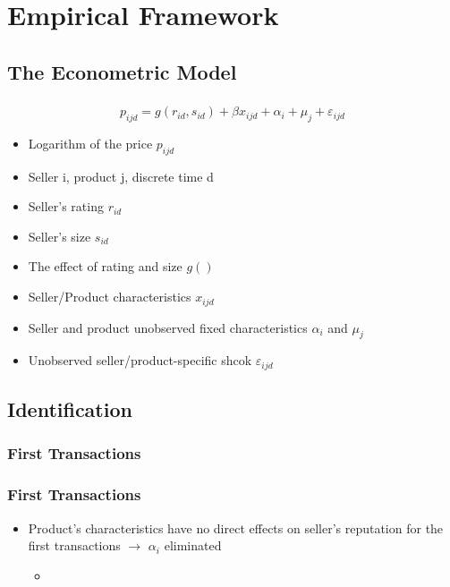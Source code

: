 \documentclass{beamer}
\begin{document}
\begin{frame}
\frametitle{}
\end{frame}

\section{}

\section{Empirical Framework}
\subsection{The Econometric Model}
\begin{frame}
\frametitle{}
$$
p_{ijd}=g(r_{id},s_{id})+\beta x_{ijd}+\alpha_i+\mu_j+\varepsilon_{ijd}
$$
\begin{itemize}
\item Logarithm of the price $p_{ijd}$
\item Seller i, product j, discrete time d
\item Seller's rating $r_{id}$
\item Seller's size $s_{id}$
\item The effect of rating and size $g()$
\item Seller/Product characteristics $x_{ijd}$
\item Seller and product unobserved fixed characteristics $\alpha_i$ and $\mu_j$
\item Unobserved seller/product-specific shcok $\varepsilon_{ijd}$
\end{itemize}
\end{frame}

\begin{frame}
\end{frame}

\subsection{Identification}
\subsubsection{First Transactions}
\begin{frame}
\frametitle{First Transactions}
\begin{itemize}
\item Product's characteristics have no direct effects on seller's reputation for the first transactions $\to$ $\alpha_i$ eliminated
\begin{itemize}
\item 
\end{itemize}
\end{itemize}
\end{frame}
\end{document}
